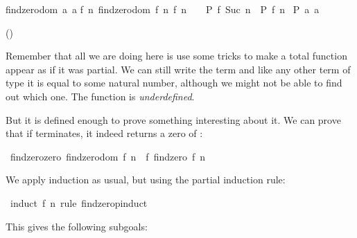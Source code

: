 \begin{isabellebody}
\begin{isamarkuptext}
  \noindent\begin{minipage}{0.79\textwidth}\begin{isabelle}%
{\isasymlbrakk}findzero{\isacharunderscore}dom\ {\isacharparenleft}{\isacharquery}a{}{\isachardot}{}{\isacharcomma}\ {\isacharquery}a{}{\isachardot}{}{\isacharparenright}{\isacharsemicolon}\isanewline
\isaindent{\ }{\isasymAnd}f\ n{\isachardot}\ {\isasymlbrakk}findzero{\isacharunderscore}dom\ {\isacharparenleft}f{\isacharcomma}\ n{\isacharparenright}{\isacharsemicolon}\ f\ n\ {\isasymnoteq}\ {}\ {\isasymLongrightarrow}\ {\isacharquery}P\ f\ {\isacharparenleft}Suc\ n{\isacharparenright}{\isasymrbrakk}\ {\isasymLongrightarrow}\ {\isacharquery}P\ f\ n{\isasymrbrakk}\isanewline
{\isasymLongrightarrow}\ {\isacharquery}P\ {\isacharquery}a{}{\isachardot}{}\ {\isacharquery}a{}{\isachardot}{}%
\end{isabelle}\end{minipage}
  \hfill()%
\end{isamarkuptext}%
\isamarkuptrue%
%
\begin{isamarkuptext}%
Remember that all we
  are doing here is use some tricks to make a total function appear
  as if it was partial. We can still write the term  and like any other term of type  it is equal
  to some natural number, although we might not be able to find out
  which one. The function is \emph{underdefined}.

  But it is defined enough to prove something interesting about it. We
  can prove that if 
  terminates, it indeed returns a zero of :%
\end{isamarkuptext}%
\isamarkuptrue%
\isamarkupfalse%
\ findzero{\isacharunderscore}zero{\isacharcolon}\ {\isachardoublequoteopen}findzero{\isacharunderscore}dom\ {\isacharparenleft}f{\isacharcomma}\ n{\isacharparenright}\ {\isasymLongrightarrow}\ f\ {\isacharparenleft}findzero\ f\ n{\isacharparenright}\ {\isacharequal}\ {}{\isachardoublequoteclose}%
\isadelimproof
%
\endisadelimproof
%
\isatagproof
%
\begin{isamarkuptxt}%
\noindent We apply induction as usual, but using the partial induction
  rule:%
\end{isamarkuptxt}%
\isamarkuptrue%
\isamarkupfalse%
\ {\isacharparenleft}induct\ f\ n\ rule{\isacharcolon}\ findzero{\isachardot}pinduct{\isacharparenright}%
\begin{isamarkuptxt}%
\noindent This gives the following subgoals:


\end{isamarkuptxt}
\end{isabellebody}
